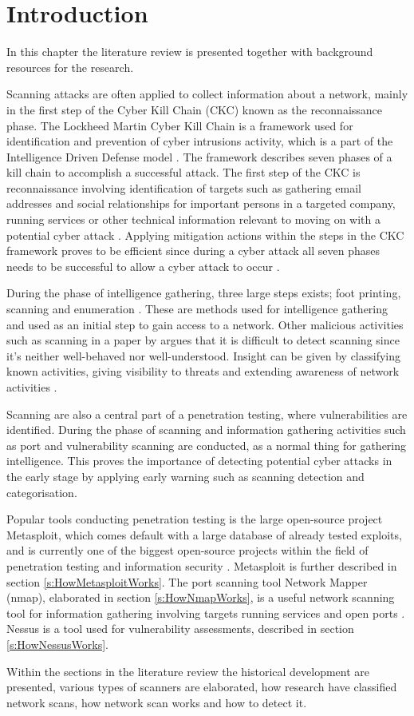 \section{Introduction}
In this chapter the literature review is presented together with background resources for the research.

Scanning attacks are often applied to collect information about a network, mainly in the first step of the Cyber Kill Chain (CKC) known as the reconnaissance phase. The Lockheed Martin Cyber Kill Chain is a framework used for identification and prevention of cyber intrusions activity, which is a part of the Intelligence Driven Defense model \autocite{lockheedmartinCKC}. The framework describes seven phases of a kill chain to accomplish a successful attack. The first step of the CKC is reconnaissance involving identification of targets such as gathering email addresses and social relationships for important persons in a targeted company, running services or other technical information relevant to moving on with a potential cyber attack \autocite{hutchins2011intelligence}. Applying mitigation actions within the steps in the CKC framework proves to be efficient since during a cyber attack all seven phases needs to be successful to allow a cyber attack to occur \autocite{lockheedmartinCKC}.

During the phase of intelligence gathering, three large steps exists; foot printing, scanning and enumeration \autocite{arkin1999network}. These are methods used for intelligence gathering and used as an initial step to gain access to a network. Other malicious activities such as scanning in a paper by \textcite{Treurniet2011} argues that it is difficult to detect scanning since it's neither well-behaved nor well-understood. Insight can be given by classifying known activities, giving visibility to threats and extending awareness of network activities \autocite{Treurniet2011}.

Scanning are also a central part of a penetration testing, where vulnerabilities are identified. During the phase of scanning and information gathering activities such as port and vulnerability scanning are conducted, as a normal thing for gathering intelligence. This proves the importance of detecting potential cyber attacks in the early stage by applying early warning such as scanning detection and categorisation.

Popular tools conducting penetration testing is the large open-source project Metasploit, which comes default with a large database of already tested exploits, and is currently one of the biggest open-source projects within the field of penetration testing and information security \autocite{MetasploitBook}. Metasploit is further described in section \ref{s:HowMetasploitWorks}.
The port scanning tool Network Mapper (nmap), elaborated in section \ref{s:HowNmapWorks}, is a useful network scanning tool for information gathering involving targets running services and open ports \autocite{pinkard2008nmap}.
Nessus is a tool used for vulnerability assessments, described in section \ref{s:HowNessusWorks}.

Within the sections in the literature review the historical development are presented, various types of scanners are elaborated, how research have classified network scans, how network scan works and how to detect it.